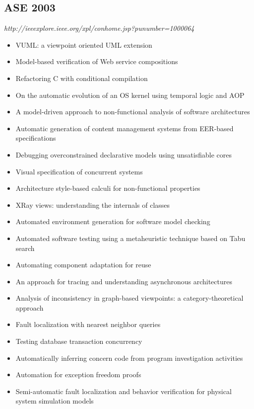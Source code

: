 \subsection{ASE 2003}

{\small \em http://ieeexplore.ieee.org/xpl/conhome.jsp?punumber=1000064}

{\small
\begin{itemize}[itemsep=-1ex]
  \item VUML: a viewpoint oriented UML extension
  \item Model-based verification of Web service compositions
  \item Refactoring C with conditional compilation
  \item On the automatic evolution of an OS kernel using temporal logic and AOP
  \item A model-driven approach to non-functional analysis of software architectures
  \item Automatic generation of content management systems from EER-based specifications
  \item Debugging overconstrained declarative models using unsatisfiable cores
  \item Visual specification of concurrent systems
  \item Architecture style-based calculi for non-functional properties
  \item XRay views: understanding the internals of classes
  \item Automated environment generation for software model checking
  \item Automated software testing using a metaheuristic technique based on Tabu search
  \item Automating component adaptation for reuse
  \item An approach for tracing and understanding asynchronous architectures
  \item Analysis of inconsistency in graph-based viewpoints: a category-theoretical approach
  \item Fault localization with nearest neighbor queries
  \item Testing database transaction concurrency
  \item Automatically inferring concern code from program investigation activities
  \item Automation for exception freedom proofs
  \item Semi-automatic fault localization and behavior verification for physical system simulation models

\end{itemize}}
